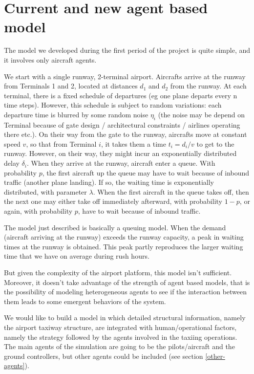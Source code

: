 \documentclass{article}
\begin{document}
\section{Current and new agent based model}

The model we developed during the first period of the project is quite simple, and it involves only aircraft agents.

We start with a single runway, 2-terminal airport. Aircrafts arrive at the runway from Terminals 1 and 2, located at distances $d_1$ and $d_2$ from the runway. At each terminal, there is a fixed schedule of departures (eg one plane departs every n time steps). However, this schedule is subject to random variations: each departure time is blurred by some random noise $\eta_i$ (the noise may be depend on Terminal because of gate design / architectural constraints / airlines operating there etc.). On their way from the gate to the runway, aircrafts move at constant speed $v$, so that from Terminal $i$, it takes them a time $t_i = d_i/v$ to get to the runway. However, on their way, they might incur an exponentially distributed delay $\delta_i$. When they arrive at the runway, aircraft enter a queue. With probability $p$, the first aircraft up the queue may have to wait because of inbound traffic (another plane landing). If so, the waiting time is exponentially distributed, with parameter $\lambda$. 
When the first aircraft in the queue takes off, then the next one may either take off immediately afterward, with probability $1-p$, or again, with probability $p$, have to wait because of inbound traffic. 
\smallskip

The model just described is basically a queuing model. When the demand (aircraft arriving at the runway) exceeds the runway capacity, a peak in waiting times at the runway is obtained. This peak partly reproduces the larger waiting time that we have on average during rush hours. 

But given the complexity of the airport platform, this model isn't sufficient. Moreover, it doesn't take advantage of the strength of agent based models, that is the possibility of modeling heterogeneous agents to see if the interaction between them leads to some emergent behaviors of the system.

We would like to build a model in which detailed structural information, namely the airport taxiway structure, are integrated with human/operational factors, namely the strategy followed by the agents involved in the taxiing operations. The main agents of the simulation are going to be the pilots/aircraft and the ground controllers, but other agents could be included (see section  \ref{other-agents}).
\end{document}
